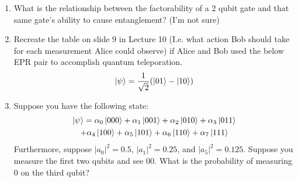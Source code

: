 \documentclass[12pt]{article}
\begin{document}
\begin{enumerate}[font=\bfseries]
    \item What is the relationship between the factorability of a 2 qubit gate and that same gate's ability to cause entanglement? (I'm not sure)
    \item Recreate the table on slide 9 in Lecture 10 (I.e. what action Bob should take for each measurement Alice could observe) if Alice and Bob used the below EPR pair to accomplish quantum teleporation.
    \[\ket{\psi} = \frac{1}{\sqrt{2}}(\ket{01}-\ket{10})\]
    \item Suppose you have the following state:
    \begin{multline} \ket{\psi} = 
        \alpha_0\ket{000} + \alpha_1\ket{001} +
                    \alpha_2\ket{010} + \alpha_3\ket{011}  \\
                    + \alpha_4\ket{100} + \alpha_5\ket{101} +
                    \alpha_6\ket{110} + \alpha_7\ket{111}
    \end{multline}
    Furthermore, suppose $|a_0|^2 = 0.5$, $|a_1|^2 = 0.25$, and $|a_5|^2 = 0.125$. Suppose you measure the first two qubits and see $00$. What is the probability of measuring 0 on the third qubit?
\end{enumerate}
\end{document}
